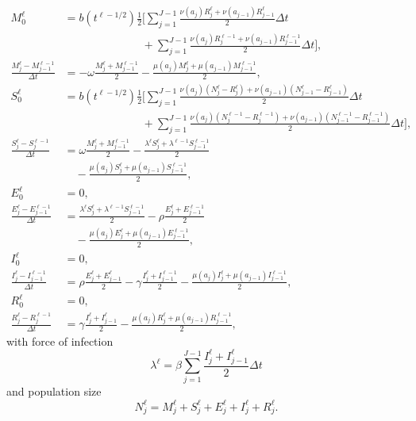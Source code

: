 \documentclass{jpmarticle}
\begin{document}
\begin{equation}
  \begin{split}
    M_0^{\ell} &=
    b(t^{\ell - 1 / 2})
    \frac{1}{2}
    \Bigg[
    \sum_{j = 1}^{J - 1}
    \frac{\nu(a_j) R_j^{\ell} + \nu(a_{j - 1}) R_{j - 1}^{\ell}}{2}
    \Delta t
    \\ & \quad\quad\quad\quad\quad\quad\quad {}
    + \sum_{j = 1}^{J - 1}
    \frac{\nu(a_j) R_j^{\ell - 1} + \nu(a_{j - 1}) R_{j - 1}^{\ell - 1}}{2}
    \Delta t
    \Bigg],
    \\
    \frac{M_j^{\ell} - M_{j - 1}^{\ell - 1}}{\Delta t} &=
    - \omega \frac{M_j^{\ell} + M_{j - 1}^{\ell - 1}}{2}
    - \frac{\mu(a_j) M_j^{\ell} + \mu(a_{j - 1}) M_{j - 1}^{\ell - 1}}{2},
    \\
    S_0^{\ell} &=
    b(t^{\ell - 1 / 2})
    \frac{1}{2}
    \Bigg[
    \sum_{j = 1}^{J - 1}
    \frac{\nu(a_j) (N_j^{\ell} - R_j^{\ell})
      + \nu(a_{j - 1}) (N_{j - 1}^{\ell} - R_{j - 1}^{\ell})}
    {2}
    \Delta t
    \\ & \quad\quad\quad\quad\quad\quad\quad {}
    + \sum_{j = 1}^{J - 1}
    \frac{\nu(a_j) (N_j^{\ell - 1} - R_j^{\ell - 1})
      + \nu(a_{j - 1}) (N_{j - 1}^{\ell - 1} - R_{j - 1}^{\ell - 1})}
    {2}
    \Delta t
    \Bigg],
    \\
    \frac{S_j^{\ell} - S_j^{\ell - 1}}{\Delta t} &=
    \omega \frac{M_j^{\ell} + M_{j - 1}^{\ell - 1}}{2}
    - \frac{\lambda^{\ell} S_j^{\ell} + \lambda^{\ell - 1} S_{j - 1}^{\ell - 1}}{2}
    \\ & \quad {}
    - \frac{\mu(a_j) S_j^{\ell} + \mu(a_{j - 1}) S_{j - 1}^{\ell - 1}}{2},
    \\
    E_0^{\ell} &= 0,
    \\
    \frac{E_j^{\ell} - E_{j - 1}^{\ell - 1}}{\Delta t} &=
    \frac{\lambda^{\ell} S_j^{\ell} + \lambda^{\ell - 1} S_{j - 1}^{\ell - 1}}{2}
    - \rho \frac{E_j^{\ell} + E_{j - 1}^{\ell - 1}}{2}
    \\ & \quad {}
    - \frac{\mu(a_j) E_j^{\ell} + \mu(a_{j - 1}) E_{j - 1}^{\ell - 1}}{2},
    \\
    I_0^{\ell} &= 0,
    \\
    \frac{I_j^{\ell} - I_{j - 1}^{\ell - 1}}{\Delta t} &=
    \rho \frac{E_j^{\ell} + E_{j - 1}^{\ell}}{2}
    - \gamma \frac{I_j^{\ell} + I_{j - 1}^{\ell - 1}}{2}
    - \frac{\mu(a_j) I_j^{\ell} + \mu(a_{j - 1}) I_{j - 1}^{\ell - 1}}{2},
    \\
    R_0^{\ell} &= 0,
    \\
    \frac{R_j^{\ell} - R_j^{\ell - 1}}{\Delta t} &=
    \gamma \frac{I_j^{\ell} + I_{j - 1}^{\ell}}{2}
    - \frac{\mu(a_j) R_j^{\ell} + \mu(a_{j - 1}) R_{j - 1}^{\ell - 1}}{2},
  \end{split}
\end{equation}
with force of infection
\begin{equation}
  \lambda^{\ell} =
  \beta \sum_{j = 1}^{J - 1}
  \frac{I_j^{\ell} + I_{j - 1}^{\ell}}{2}
  \Delta t
\end{equation}
and population size
\begin{equation}
  N_j^{\ell} =
  M_j^{\ell} + S_j^{\ell} + E_j^{\ell} + I_j^{\ell} + R_j^{\ell}.
\end{equation}
\end{document}
